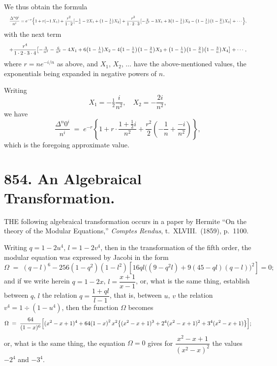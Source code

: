 \documentclass[11pt]{article}
\begin{document}
\medskip

We thus obtain the formula
\[ \resizebox{\textwidth}{!}{$\displaystyle
\frac{\Delta^n 0^i}{n^i} = e^{-r}\Bigl\{1
+ r(-1\,X_1)
+ \frac{r^2}{1\cdot 2}\!\left[-\tfrac{1}{n}-2X_1+\left(1-\tfrac{1}{n}\right)\!X_2\right]
+ \frac{r^3}{1\cdot 2\cdot 3}\!\left[-\tfrac{2}{n^2}-3X_1+3\!\left(1-\tfrac{1}{n}\right)\!X_2 - \left(1-\tfrac{1}{n}\right)\!\left(1-\tfrac{2}{n}\right)\!X_3\right] + \cdots \Bigr\}, $} \]
with the next term
\[ \resizebox{\textwidth}{!}{$\displaystyle
+ \frac{r^4}{1\cdot 2\cdot 3\cdot 4}\!\left[-\tfrac{3}{n^2}-\tfrac{6}{n^3}-4X_1+6\!\left(1-\tfrac{1}{n}\right)\!X_2 - 4\!\left(1-\tfrac{1}{n}\right)\!\left(1-\tfrac{2}{n}\right)\!X_3 + \left(1-\tfrac{1}{n}\right)\!\left(1-\tfrac{2}{n}\right)\!\left(1-\tfrac{3}{n}\right)\!X_4\right]+\cdots, $} \]
where $r=ne^{-i/n}$ as above, and $X_1$, $X_2$, $\ldots$ have the above-mentioned values, the exponentials being expanded in negative powers of $n$.

Writing
\[
X_1 = -\tfrac{1}{2}\frac{i}{n^2},\quad X_2 = -\frac{2i}{n^2},
\]
we have
\[
\frac{\Delta^n 0^i}{n^i} \;=\; e^{-r}\!\left\{1 + r\!\cdot\!\frac{1+\tfrac{1}{2}i}{n^2} + \frac{r^2}{2}\!\left(-\frac{1}{n}+\frac{-i}{n^2}\right)\right\},
\]
which is the foregoing approximate value.

\vfill

\newpage

\section*{854. An Algebraical Transformation.}


\medskip

\noindent THE following algebraical transformation occurs in a paper by Hermite ``On the theory of the Modular Equations,'' \emph{Comptes Rendus}, t.~XLVIII.\ (1859), p.~1100.

Writing $q = 1-2u^4$, $l = 1-2v^4$, then in the transformation of the fifth order, the modular equation was expressed by Jacobi in the form
\[
\Omega \;=\; (q-l)^6 - 256(1-q^2)(1-l^2)\!\left[16ql\bigl((9-q^2 l)+9(45-ql)(q-l)\bigr) ^2 \right] = 0;
\]
and if we write herein $q = 1-2x$, $l = \dfrac{x+1}{x-1}$, or, what is the same thing, establish between $q$, $l$ the relation $q = \dfrac{1+ql}{l-1}$, that is, between $u$, $v$ the relation $v^4 = 1\div(1-u^4)$, then the function $\Omega$ becomes
\[
\Omega \;=\; \frac{64}{(1-x)^6}\Bigl[(x^2-x+1)^4 + 64\!\left(1-x\right)^2 x^2 \bigl\{(x^2-x+1)^3 + 2^4 (x^2-x+1)^2 + 3^4 (x^2-x+1)\bigr\}\Bigr];
\]
or, what is the same thing, the equation $\Omega = 0$ gives for $\dfrac{x^2-x+1}{(x^2-x)^2}$ the values $-2^4$ and $-3^4$.
\end{document}
